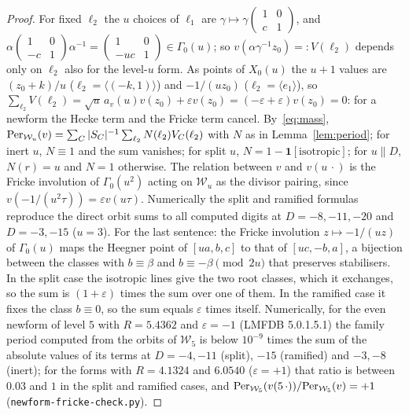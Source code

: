 \documentclass[11pt,a4paper]{article}
\theoremstyle{remark}\newtheorem{remark}[theorem]{Remark}
\begin{document}
\begin{proof}
For fixed $\ell_2$ the $u$ choices of $\ell_1$ are $\gamma\mapsto\gamma\left(\begin{smallmatrix}1&0\\ c&1\end{smallmatrix}\right)$, and
$\alpha\left(\begin{smallmatrix}1&0\\-c&1\end{smallmatrix}\right)\alpha^{-1}=\left(\begin{smallmatrix}1&0\\-uc&1\end{smallmatrix}\right)\in\Gamma_0(u)$;
so $v(\alpha\gamma^{-1}z_0)=:V(\ell_2)$ depends only on $\ell_2$ also for the level-$u$ form. As points of $X_0(u)$ the $u+1$
values are $(z_0+k)/u$ ($\ell_2=\langle(-k,1)\rangle$) and $-1/(uz_0)$ ($\ell_2=\langle e_1\rangle$), so
$\sum_{\ell_2}V(\ell_2)=\sqrt u\,a_v(u)v(z_0)+\varepsilon v(z_0)=(-\varepsilon+\varepsilon)v(z_0)=0$: for a newform the Hecke term and the Fricke
term cancel. By~\eqref{eq:mass}, $\mathrm{Per}_{\mathcal W_u}(v)=\sum_C|S_C|^{-1}\sum_{\ell_2}N(\ell_2)V_C(\ell_2)$ with $N$ as in Lemma~\ref{lem:period};
for inert $u$, $N\equiv1$ and the sum vanishes; for split $u$, $N=1-\mathbf 1[\text{isotropic}]$; for $u\parallel D$, $N(r)=u$ and
$N=1$ otherwise. The relation between $v$ and $v(u\,\cdot)$ is the Fricke involution of $\Gamma_0(u^2)$ acting on $\mathcal W_u$ as the
divisor pairing, since $v(-1/(u^2\tau))=\varepsilon v(u\tau)$. Numerically the split and ramified formulas reproduce the direct orbit
sums to all computed digits at $D=-8,-11,-20$ and $D=-3,-15$ ($u=3$). For the last sentence: the Fricke involution
$z\mapsto-1/(uz)$ of $\Gamma_0(u)$ maps the Heegner point of $[ua,b,c]$ to that of $[uc,-b,a]$, a bijection between the classes with
$b\equiv\beta$ and $b\equiv-\beta\pmod{2u}$ that preserves stabilisers. In the split case the isotropic lines give the two root classes,
which it exchanges, so the sum is $(1+\varepsilon)$ times the sum over one of them. In the ramified case it fixes the class
$b\equiv0$, so the sum equals $\varepsilon$ times itself. Numerically, for the even newform of level $5$ with $R=5.4362$ and
$\varepsilon=-1$ (LMFDB 5.0.1.5.1) the family period computed from the orbits of $\mathcal W_5$ is below $10^{-9}$ times the sum of the
absolute values of its terms at $D=-4,-11$ (split), $-15$ (ramified) and $-3,-8$ (inert); for the forms with $R=4.1324$ and $6.0540$
($\varepsilon=+1$) that ratio is between $0.03$ and $1$ in the split and ramified cases, and $\mathrm{Per}_{\mathcal W_5}(v(5\,\cdot))/\mathrm{Per}_{\mathcal W_5}(v)=+1$
(\texttt{newform-fricke-check.py}).
\end{proof}
\end{document}
